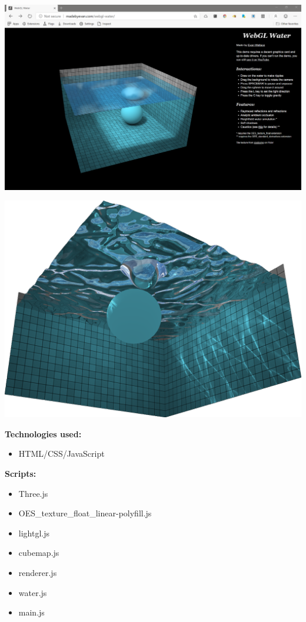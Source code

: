 \documentclass[10pt,oneside,onecolumn,letterpaper]{article}
\begin{document}
\vspace{.5cm} %

\noindent\includegraphics[width=\textwidth]{gfx/full-screenshot-madebyevan_webgl_water.png}

\vspace{.5cm}
\noindent\includegraphics[width=\textwidth]{gfx/screenshot-madebyevan_webgl_water.png}

\vspace{.5cm}

\noindent\textbf{Technologies used:}

\begin{itemize}
    \item HTML/CSS/JavaScript
\end{itemize}

\noindent\textbf{Scripts:}
\begin{itemize}

    \item Three.js
    \item OES\_texture\_float\_linear-polyfill.js
    \item lightgl.js
    \item cubemap.js
    \item renderer.js
    \item water.js
    \item main.js
\end{itemize}
\end{document}
